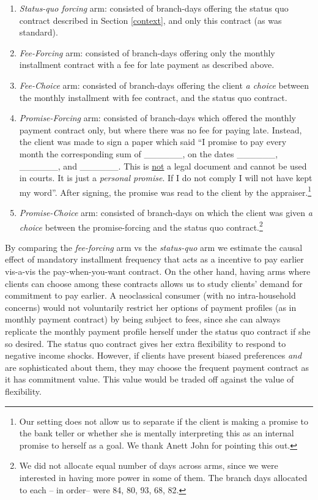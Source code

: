 \documentclass[oneside,11pt]{article}
\begin{document}
\begin{enumerate}
    \item \textit{Status-quo forcing} arm: consisted of branch-days offering the status quo contract described in Section \ref{context}, and only this contract (as was standard). 
    \item \textit{Fee-Forcing} arm: consisted of branch-days offering only the monthly installment contract with a fee for late payment as described above. 
    \item \textit{Fee-Choice} arm: consisted of branch-days offering the client \textit{a choice} between the monthly installment with fee contract, and the status quo contract.
    \item \textit{Promise-Forcing} arm: consisted of branch-days which offered the monthly payment contract only, but where there was no fee for paying late. Instead, the client was made to sign a paper which said ``I promise to pay every month the corresponding sum of \_\_\_\_\_\_, on the dates \_\_\_\_\_\_, \_\_\_\_\_\_, and \_\_\_\_\_\_. This is \underline{not} a legal document and cannot be used in courts. It is just a \textit{personal promise}. If I do not comply I will not have kept my word''. After signing, the promise was read to the client by the appraiser.\footnote{Our setting does not allow us to separate if the client is making a promise to the bank teller or whether she is mentally interpreting this as an internal promise to herself as a goal. We thank Anett John for pointing this out.}
    
    \item \textit{Promise-Choice} arm: consisted of branch-days on which the client was given \textit{a choice} between the promise-forcing and the status quo contract.\footnote{We did not allocate equal number of days across arms, since we were interested in having more power in some of them. The branch days allocated to each -- in order-- were 84, 80, 93, 68, 82.}
\end{enumerate}

By comparing the \textit{fee-forcing} arm vs the \textit{status-quo} arm we estimate the causal effect of mandatory installment frequency that acts as a incentive to pay earlier vis-a-vis the pay-when-you-want contract. On the other hand, having arms where clients can choose among these contracts allows us to study clients' demand for commitment to pay earlier. A neoclassical consumer (with no intra-household concerns) would not voluntarily restrict her options of payment profiles (as in monthly payment contract) by being subject to fees, since she can always replicate the monthly payment profile herself under the status quo contract if she so desired. The status quo contract gives her extra flexibility to respond to negative income shocks. However, if clients have present biased preferences \textit{and} are sophisticated about them, they may choose the frequent payment contract as it has commitment value. This value would be traded off against the value of flexibility. 
\end{document}
